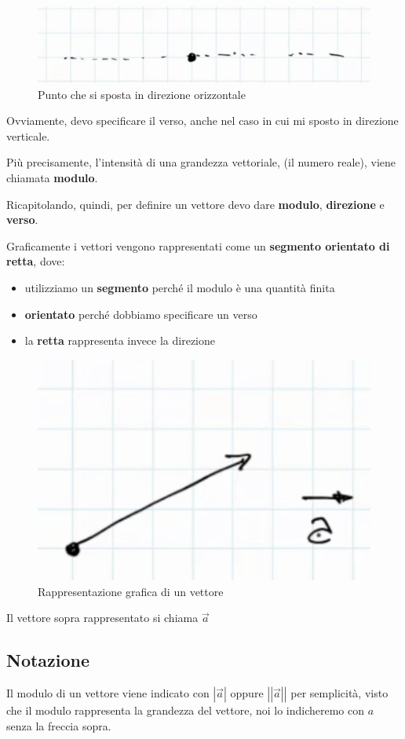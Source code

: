 \documentclass[a4paper]{book}
\begin{document}
\begin{figure}[h]
\begin{center}
\includegraphics[width = 0.5 \textwidth]{direzione}
\caption{Punto che si sposta in direzione orizzontale}
\label{fig:direzione}
\end{center}
\end{figure}

Ovviamente, devo specificare il verso, anche nel caso in cui mi sposto in direzione verticale.

Più precisamente, l'intensità di una grandezza vettoriale, (il numero reale), viene chiamata \textbf{modulo}.

Ricapitolando, quindi, per definire un vettore devo dare \textbf{modulo}, \textbf{direzione} e \textbf{verso}. 

Graficamente i vettori vengono rappresentati come un \textbf{segmento orientato di retta},  dove:
\begin{itemize}
\item utilizziamo un \textbf{segmento} perché il modulo è una quantità finita
\item \textbf{orientato} perché dobbiamo specificare un verso
\item la \textbf{retta} rappresenta invece la direzione
\end{itemize}

\begin{figure}[h]
\begin{center}
\includegraphics[width = 0.5 \textwidth]{vettore 1}
\caption{Rappresentazione grafica di un vettore}
\label{fig:vettore 1}
\end{center}
\end{figure}
Il vettore sopra rappresentato si chiama $\overrightarrow{a}$
\subsection{Notazione}
Il modulo di un vettore viene indicato con $\left | \overrightarrow{a} \right |$ oppure
$\left | \left | \overrightarrow{a} \right | \right |$ per semplicità, visto che il modulo rappresenta la grandezza del vettore, noi lo indicheremo con $a$ senza la freccia sopra.
\end{document}
